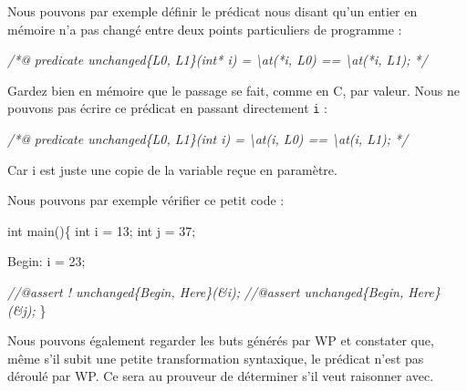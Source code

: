 \documentclass[12pt,francais,]{scrbook}
\newenvironment{Shaded}{}{}
\newcommand{\DataTypeTok}[1]{\textcolor[rgb]{0.56,0.13,0.00}{{#1}}}
\newcommand{\DecValTok}[1]{\textcolor[rgb]{0.25,0.63,0.44}{{#1}}}
\newcommand{\CommentTok}[1]{\textcolor[rgb]{0.38,0.63,0.69}{\textit{{#1}}}}
\newcommand{\CommentTokAlt}[1]{\textcolor[rgb]{0.18,0.33,0.39}{\textit{{#1}}}}
\newcommand{\NormalTok}[1]{{#1}}
\newenvironment{zdsalertblock}[1]{%
  \tcolorbox[beamer,%
    noparskip,breakable,
    colback=LightCoral,colframe=DarkRed,%
    colbacklower=Tomato,%
    title=#1]
}{\endtcolorbox}
\begin{document}
Nous pouvons par exemple définir le prédicat nous disant qu'un entier en
mémoire n'a pas changé entre deux points particuliers de programme :

\begin{footnotesize}\begin{Shaded}
\begin{Highlighting}[]
\CommentTok{/*@}
\CommentTok{  predicate unchanged\{L0, L1\}(int* i) =}
\CommentTok{    \textbackslash{}at(*i, L0) == \textbackslash{}at(*i, L1);}
\CommentTok{*/}
\end{Highlighting}
\end{Shaded}\end{footnotesize}

\begin{zdsalertblock}{Attention}
  Gardez bien en mémoire que le passage
  se fait, comme en C, par valeur. Nous ne pouvons pas écrire
  ce prédicat en passant directement \texttt{i} :
  \begin{footnotesize}\begin{Shaded}
    \begin{Highlighting}[]
\CommentTokAlt{/*@}
\CommentTokAlt{  predicate unchanged\{L0, L1\}(int i) =}
\CommentTokAlt{    \textbackslash{}at(i, L0) == \textbackslash{}at(i, L1);}
\CommentTokAlt{*/}
    \end{Highlighting}
  \end{Shaded}\end{footnotesize}
  Car i est juste une copie de la variable reçue en paramètre.
\end{zdsalertblock}

Nous pouvons par exemple vérifier ce petit code :

\begin{footnotesize}\begin{Shaded}
\begin{Highlighting}[]
\DataTypeTok{int} \NormalTok{main()\{}
  \DataTypeTok{int} \NormalTok{i = }\DecValTok{13}\NormalTok{;}
  \DataTypeTok{int} \NormalTok{j = }\DecValTok{37}\NormalTok{;}

 \NormalTok{Begin:}
  \NormalTok{i = }\DecValTok{23}\NormalTok{;}
 
  \CommentTok{//@assert ! unchanged\{Begin, Here\}(&i);}
  \CommentTok{//@assert   unchanged\{Begin, Here\}(&j);}
\NormalTok{\}}
\end{Highlighting}
\end{Shaded}\end{footnotesize}

Nous pouvons également regarder les buts générés par WP et constater
que, même s'il subit une petite transformation syntaxique, le prédicat
n'est pas déroulé par WP. Ce sera au prouveur de déterminer s'il veut
raisonner avec.
\end{document}
